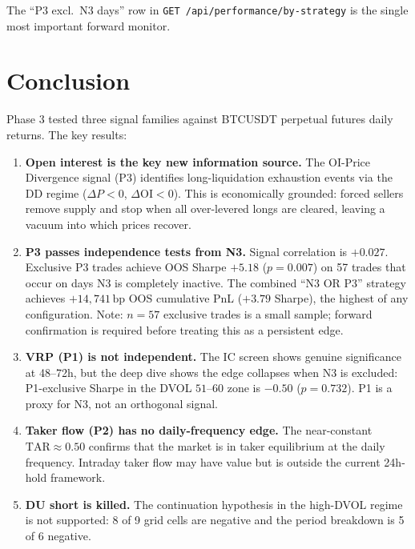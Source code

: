 \documentclass[12pt, a4paper]{article}
\theoremstyle{plain}
\theoremstyle{definition}
\newcommand{\OI}{\mathrm{OI}}
\newcommand{\TAR}{\mathrm{TAR}}
\newcommand{\bp}{\,\mathrm{bp}}
\begin{document}
The ``P3 excl.\ N3 days'' row in \texttt{GET /api/performance/by-strategy}
is the single most important forward monitor.

\section{Conclusion}
\label{sec:conclusion}

Phase 3 tested three signal families against BTCUSDT perpetual futures
daily returns.  The key results:

\begin{enumerate}
  \item \textbf{Open interest is the key new information source.}  The
        OI-Price Divergence signal (P3) identifies long-liquidation
        exhaustion events via the DD regime ($\Delta P < 0$, $\Delta\OI < 0$).
        This is economically grounded: forced sellers remove supply
        and stop when all over-levered longs are cleared, leaving a
        vacuum into which prices recover.

  \item \textbf{P3 passes independence tests from N3.}  Signal
        correlation is $+0.027$.  Exclusive P3 trades achieve OOS
        Sharpe $+5.18$ ($p = 0.007$) on 57 trades that occur on days
        N3 is completely inactive.  The combined ``N3 OR P3'' strategy
        achieves $+14{,}741\bp$ OOS cumulative PnL ($+3.79$ Sharpe),
        the highest of any configuration.  Note: $n = 57$ exclusive
        trades is a small sample; forward confirmation is required
        before treating this as a persistent edge.

  \item \textbf{VRP (P1) is not independent.}  The IC screen shows
        genuine significance at 48--72h, but the deep dive shows
        the edge collapses when N3 is excluded: P1-exclusive Sharpe
        in the DVOL $51$--$60$ zone is $-0.50$ ($p = 0.732$).  P1
        is a proxy for N3, not an orthogonal signal.

  \item \textbf{Taker flow (P2) has no daily-frequency edge.}  The
        near-constant $\TAR \approx 0.50$ confirms that the market
        is in taker equilibrium at the daily frequency.  Intraday
        taker flow may have value but is outside the current
        24h-hold framework.

  \item \textbf{DU short is killed.}  The continuation hypothesis in
        the high-DVOL regime is not supported: 8 of 9 grid cells are
        negative and the period breakdown is 5 of 6 negative.
\end{enumerate}
\end{document}
